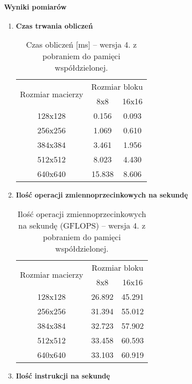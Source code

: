 \paragraph{Wyniki pomiarów}

\begin{enumerate}

\item \textbf{Czas trwania obliczeń} \newline

\begin{table}[H]
\centering
\begin{tabular}{|c|c|c|}
\hline
\multirow{2}{*}{Rozmiar macierzy} & \multicolumn{2}{c|}{Rozmiar bloku} \\ \cline{2-3}
& 8x8 & 16x16 \\ \hline
128x128 & 0.156 & 0.093 \\ \hline
256x256 & 1.069 & 0.610 \\ \hline
384x384 & 3.461 & 1.956 \\ \hline
512x512 & 8.023 & 4.430 \\ \hline
640x640 & 15.838 & 8.606 \\ \hline
\end{tabular}
\caption{Czas obliczeń [ms] -- wersja 4. z pobraniem do pamięci współdzielonej.}
\end{table}

\item \textbf{Ilość operacji zmiennoprzecinkowych na sekundę} \newline

\begin{table}[H]
\centering
\begin{tabular}{|c|c|c|}
\hline
\multirow{2}{*}{Rozmiar macierzy} & \multicolumn{2}{c|}{Rozmiar bloku} \\ \cline{2-3}
& 8x8 & 16x16 \\ \hline
128x128 & 26.892 & 45.291 \\ \hline
256x256 & 31.394 & 55.012 \\ \hline
384x384 & 32.723 & 57.902 \\ \hline
512x512 & 33.458 & 60.593 \\ \hline
640x640 & 33.103 & 60.919 \\ \hline
\end{tabular}
\caption{Ilość operacji zmiennoprzecinkowych na sekundę (GFLOPS) -- wersja 4. z pobraniem do pamięci współdzielonej.}
\end{table}

\item \textbf{Ilość instrukcji na sekundę} \newline


\end{enumerate}
